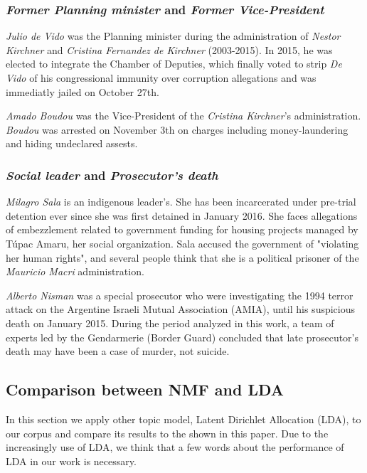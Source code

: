 \documentclass[a4paper, 12pt]{article}
\begin{document}
\subsubsection{\emph{Former Planning minister} and \emph{Former Vice-President}}

\par \emph{Julio de Vido} was the Planning minister during the administration of \emph{Nestor Kirchner} and \emph{Cristina Fernandez de Kirchner} (2003-2015). In 2015, he was elected to integrate the Chamber of Deputies, which finally voted to strip \emph{De Vido} of his congressional immunity over corruption allegations and was immediatly jailed on October 27th.

\par \emph{Amado Boudou} was the Vice-President of the \emph{Cristina Kirchner}'s administration.
\emph{Boudou} was arrested on November 3th on charges including money-laundering and hiding undeclared assests.

\subsubsection{\emph{Social leader} and \emph{Prosecutor's death}}

\par \emph{Milagro Sala} is an indigenous leader’s. 
She has been incarcerated under pre-trial detention ever since she was first detained in January 2016. She faces allegations of embezzlement related to government funding for housing projects managed by T\'upac Amaru, her social organization.
Sala accused the government of "violating her human rights", and several people think that she is a political prisoner of the \emph{Mauricio Macri} administration.

\par \emph{Alberto Nisman} was a special prosecutor who were investigating the 1994 terror attack on the Argentine Israeli Mutual Association (AMIA), until his suspicious death on January 2015.
During the period analyzed in this work, a team of experts led by the Gendarmerie (Border Guard) concluded that late prosecutor's death may have been a case of murder, not suicide.


\subsection{Comparison between NMF and LDA}

\par In this section we apply other topic model, Latent Dirichlet Allocation \cite{blei2003latent} (LDA), to our corpus and compare its results to the shown in this paper. Due to the increasingly use of LDA, we think that a few words about the performance of LDA in our work is necessary. 
\end{document}
